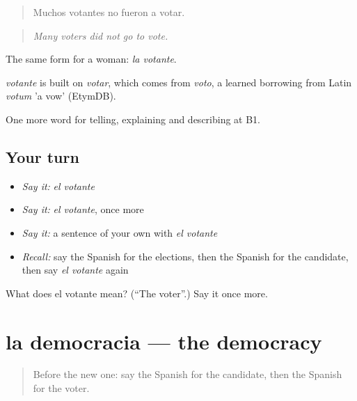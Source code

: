 \begin{quote}
Muchos votantes no fueron a votar.
\end{quote}

\begin{quote}
\emph{Many voters did not go to vote.}
\end{quote}

The same form for a woman: \emph{la votante}.

\begin{cousinweb}
\emph{votante} is built on \emph{votar}, which comes from \emph{voto}, a learned borrowing from Latin \emph{votum} 'a vow' (EtymDB).
\end{cousinweb}

\begin{grammarlens}[title={What you've built}]
One more word for telling, explaining and describing at B1.
\end{grammarlens}

\subsection*{Your turn}
\begin{itemize}
\raggedright
  \item \emph{Say it:} \emph{el votante}
  \item \emph{Say it:} \emph{el votante}, once more
  \item \emph{Say it:} a sentence of your own with \emph{el votante}
  \item \emph{Recall:} say the Spanish for the elections, then the Spanish for the candidate, then say \emph{el votante} again
\end{itemize}

\begin{tcolorbox}[breakable,colback=teal!4,colframe=teal!35!black,title={Before you move on}]
What does el votante mean? (\textquotedblleft{}The voter\textquotedblright{}.) Say it once more.
\end{tcolorbox}
\section[la democracia]{la democracia — the democracy}

\label{lesson:ES-C602-democracia}



\begin{quote}
Before the new one: say the Spanish for the candidate, then the Spanish for the voter.
\end{quote}


